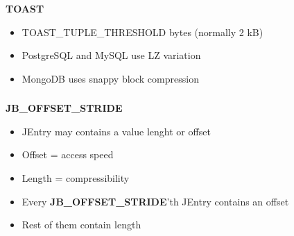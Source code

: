 \documentclass[usenames,dvipsnames, 18pt, compress, aspectratio=169]{beamer}
\begin{document}
\begin{frame}
    \frametitle{}
    \begin{center}
    \textbf{TOAST}
    \vspace{20pt}


    \vspace{20pt}
    \begin{itemize}[label={\MVRightarrow}]
        \item TOAST\_TUPLE\_THRESHOLD bytes (normally 2 kB)
        \item PostgreSQL and MySQL use LZ variation
        \item MongoDB uses snappy block compression
    \end{itemize}

    \end{center}
\end{frame}

\begin{frame}
    \frametitle{}
    \begin{center}
    \textbf{JB\_OFFSET\_STRIDE}

    \begin{itemize}[label={\MVRightarrow}]
        \item JEntry may contains a value lenght or offset
        \item Offset = access speed
        \item Length = compressibility
        \item Every \textbf{JB\_OFFSET\_STRIDE}'th JEntry contains an offset
        \item Rest of them contain length
    \end{itemize}
    \end{center}
\end{frame}
\end{document}
